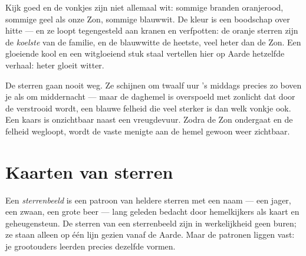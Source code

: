 \begin{example}[Sterrenkleuren]\label{ex:g5:stars-night-sky:colors}
Kijk goed en de vonkjes zijn niet allemaal wit: sommige branden
oranjerood, sommige geel als onze Zon, sommige blauwwit. De kleur is
een boodschap over hitte --- en ze loopt tegengesteld aan kranen en
verfpotten: de oranje sterren zijn de \emph{koelste} van de familie,
en de blauwwitte de heetste, veel heter dan de Zon. Een gloeiende kool
en een witgloeiend stuk staal vertellen hier op Aarde hetzelfde
verhaal: heter gloeit witter.
\end{example}

\begin{remark}\label{rem:g5:stars-night-sky:daytime}
De sterren gaan nooit weg. Ze schijnen om twaalf uur 's middags precies
zo boven je als om middernacht --- maar de daghemel is overspoeld met
zonlicht dat door de  verstrooid wordt, een blauwe felheid die veel
sterker is dan welk vonkje ook. Een kaars is onzichtbaar naast een
vreugdevuur. Zodra de Zon ondergaat en de felheid wegloopt, wordt de
vaste menigte aan de hemel gewoon weer zichtbaar.
\end{remark}

\section{Kaarten van sterren}

\begin{definition}[Sterrenbeeld]\label{def:g5:stars-night-sky:constellation}
Een \emph{sterrenbeeld} is een patroon van heldere
sterren met een naam --- een jager, een zwaan, een grote beer ---
lang geleden bedacht door hemelkijkers als kaart en geheugensteun. De
sterren van een sterrenbeeld zijn in werkelijkheid geen buren; ze
staan alleen op één lijn gezien vanaf de Aarde. Maar de patronen
liggen vast: je grootouders leerden precies dezelfde vormen.
\end{definition}

